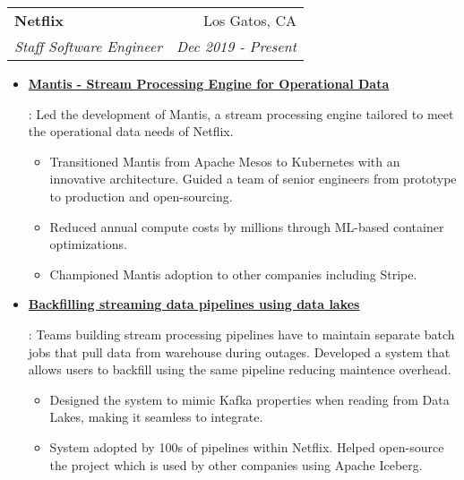 \documentclass[letterpaper,11pt]{article}
\makeatletter
\newcommand{\resumeItem}[2]{
  \item\small{
    \textbf{#1}{: #2 \vspace{-2pt}}
  }
}
\newcommand{\resumeSubheading}[4]{
  \vspace{-1pt}\item
    \begin{tabular*}{0.97\textwidth}[t]{l@{\extracolsep{\fill}}r}
      \textbf{#1} & #2 \\
      \textit{\small#3} & \textit{\small #4} \\
    \end{tabular*}\vspace{-5pt}
}
\newcommand{\resumeSubSubheading}[2]{
    \begin{tabular*}{0.97\textwidth}{l@{\extracolsep{\fill}}r}
      \textit{\small#1} & \textit{\small #2} \\
    \end{tabular*}\vspace{-5pt}
}
\newcommand{\resumeItemListStart}{\begin{itemize}}
\newcommand{\resumeItemListEnd}{\end{itemize}}
\makeatother
\begin{document}
\resumeSubheading
{Netflix}{Los Gatos, CA}
{Staff Software Engineer}{Dec 2019 - Present}
\resumeItemListStart
\resumeItem{\href{https://www.sundaram.io/slides/mantis.pdf}{Mantis - Stream Processing Engine for Operational Data}}
{
  Led the development of Mantis, a stream processing engine tailored to meet the operational data needs of Netflix.
  \begin{itemize}[label=\textbf{--}]
    \item
          Transitioned Mantis from Apache Mesos to Kubernetes with an innovative architecture.
          Guided a team of senior engineers from prototype to production and open-sourcing.
    \item
          Reduced annual compute costs by millions through ML-based container optimizations.
    \item
          Championed Mantis adoption to other companies including Stripe.
  \end{itemize}
}
\resumeItem{\href{https://www.youtube.com/watch?v=tB4rx_W9Xqw}{Backfilling streaming data pipelines using data lakes}}
{
  Teams building stream processing pipelines have to maintain separate batch jobs that pull data from warehouse during outages.
  Developed a system that allows users to backfill using the same pipeline reducing maintence overhead.
  \begin{itemize}[label=\textbf{--}]
    \item
          Designed the system to mimic Kafka properties when reading from Data Lakes, making it seamless to integrate.
    \item
          System adopted by 100s of pipelines within Netflix. Helped open-source the project which is used by other companies using Apache Iceberg.
  \end{itemize}
}
\resumeItemListEnd


\end{document}
